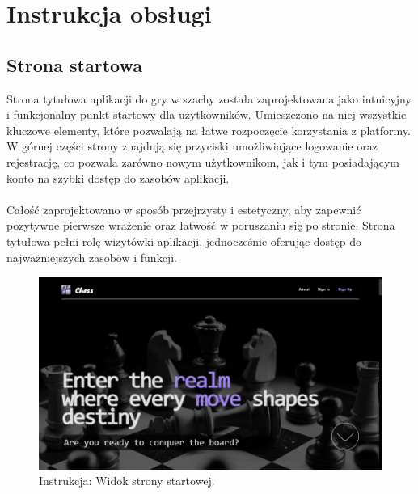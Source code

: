 \documentclass[twoside]{projektInzynierskiMS1}
\begin{document}
\newpage

\section{Instrukcja obsługi}

\subsection{Strona startowa}

\noindent
Strona tytułowa aplikacji do gry w szachy została zaprojektowana jako intuicyjny i funkcjonalny punkt startowy dla użytkowników. Umieszczono na niej wszystkie kluczowe elementy, które pozwalają na łatwe rozpoczęcie korzystania z platformy. W górnej części strony znajdują się przyciski umożliwiające logowanie oraz rejestrację, co pozwala zarówno nowym użytkownikom, jak i tym posiadającym konto na szybki dostęp do zasobów aplikacji.
\\\\
Całość zaprojektowano w sposób przejrzysty i estetyczny, aby zapewnić pozytywne pierwsze wrażenie oraz łatwość w poruszaniu się po stronie. Strona tytułowa pełni rolę wizytówki aplikacji, jednocześnie oferując dostęp do najważniejszych zasobów i funkcji.

\vspace{0.5cm}
\begin{figure}[h!]
    \centering
    \includegraphics[width=1\textwidth]{images/ins_hero.png}
    \caption{Instrukcja: Widok strony startowej.}
\end{figure}
\vspace{0.5cm}

\newpage
\end{document}
